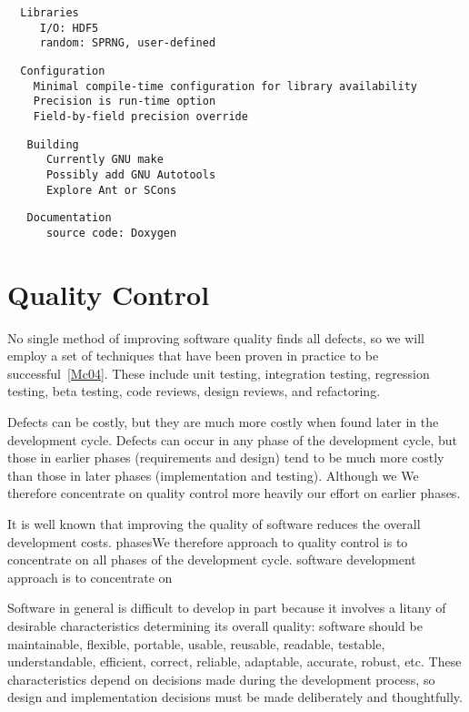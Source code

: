 \documentclass{article}
\begin{document}
\begin{verbatim}
  Libraries
     I/O: HDF5
     random: SPRNG, user-defined
\end{verbatim}

\begin{verbatim}
  Configuration
    Minimal compile-time configuration for library availability
    Precision is run-time option
    Field-by-field precision override
\end{verbatim}

\begin{verbatim}
   Building
      Currently GNU make
      Possibly add GNU Autotools
      Explore Ant or SCons
\end{verbatim}


\begin{verbatim}
   Documentation
      source code: Doxygen
\end{verbatim}



\section{Quality Control} \label{s:testing}

No single method of improving software quality finds all defects, so
we will employ a set of techniques that have been proven in practice
to be successful~\ref{Mc04}.  These include unit testing, integration
testing, regression testing, beta testing, code reviews, design reviews, and
refactoring.

Defects can be costly, but they are much more costly when found later
in the development cycle.  Defects can occur in any phase of the
development cycle, but those in earlier phases (requirements and
design) tend to be much more costly than those in later phases
(implementation and testing).  Although we We therefore concentrate on quality
control more heavily our effort on earlier phases.

It is well known that improving the quality of software reduces the overall
development costs. 
 phasesWe therefore
approach to quality control is to concentrate on all phases of the
development cycle.  software development approach is to 
concentrate on 

Software in general is difficult to develop in part because it
involves a litany of desirable characteristics determining its overall
quality: software should be maintainable, flexible, portable,
usable, reusable, readable, testable, understandable, efficient, correct,
reliable, adaptable, accurate, robust, etc.  These characteristics
depend on decisions made during the development process, so design
and implementation decisions must be made deliberately and thoughtfully.
\end{document}
